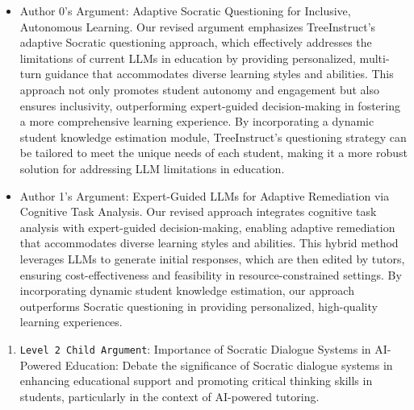 \begin{enumerate}
\begin{enumerate}
        \begin{itemize}
            \item Author 0's Argument: Adaptive Socratic Questioning for Inclusive, Autonomous Learning. Our revised argument emphasizes TreeInstruct's adaptive Socratic questioning approach, which effectively addresses the limitations of current LLMs in education by providing personalized, multi-turn guidance that accommodates diverse learning styles and abilities. This approach not only promotes student autonomy and engagement but also ensures inclusivity, outperforming expert-guided decision-making in fostering a more comprehensive learning experience. By incorporating a dynamic student knowledge estimation module, TreeInstruct's questioning strategy can be tailored to meet the unique needs of each student, making it a more robust solution for addressing LLM limitations in education.
		\item Author 1's Argument: Expert-Guided LLMs for Adaptive Remediation via Cognitive Task Analysis. Our revised approach integrates cognitive task analysis with expert-guided decision-making, enabling adaptive remediation that accommodates diverse learning styles and abilities. This hybrid method leverages LLMs to generate initial responses, which are then edited by tutors, ensuring cost-effectiveness and feasibility in resource-constrained settings. By incorporating dynamic student knowledge estimation, our approach outperforms Socratic questioning in providing personalized, high-quality learning experiences.
        \end{itemize}
    \end{enumerate}

    \begin{enumerate}
        \item \texttt{Level 2 Child Argument}: Importance of Socratic Dialogue Systems in AI-Powered Education: Debate the significance of Socratic dialogue systems in enhancing educational support and promoting critical thinking skills in students, particularly in the context of AI-powered tutoring.


\end{enumerate}
\end{enumerate}
